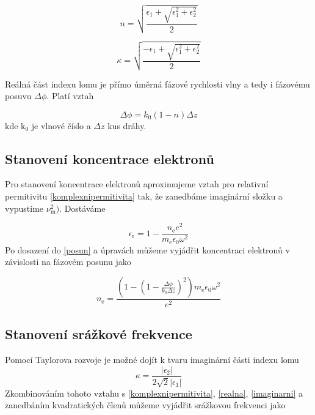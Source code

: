\documentclass[a4paper,12pt]{article}
\begin{document}
\begin{equation}
	n = \sqrt{\frac{\epsilon_1 + \sqrt{\epsilon_1^2 + \epsilon_2^2}}{2}}
	\label{realna}
\end{equation}

\begin{equation}
	\kappa = \sqrt{\frac{-\epsilon_1 + \sqrt{\epsilon_1^2 + \epsilon_2^2}}{2}}
	\label{imaginarni}
\end{equation}

Reálná část indexu lomu je
přímo úměrná fázové rychlosti vlny a tedy i fázovému posuvu $\Delta\phi$. Platí vztah

\begin{equation}
 	\Delta\phi = k_0(1-n) \Delta z
 	\label{posun}
\end{equation}
kde k$_0$ je vlnové číslo a $\Delta z$ kus dráhy.  

\subsection{Stanovení koncentrace elektronů}
Pro stanovení koncentrace elektronů aproximujeme vztah pro relativní permitivitu 
\eqref{komplexnipermitivita} tak, že zanedbáme imaginární složku a vypustíme 
$\nu_\text{m}^2)$. Dostáváme

\begin{equation}
	\epsilon_\text{r} = 1- \frac{n_\text{e} e^2}{m_\text{e} \epsilon_0 \omega^2}
	\label{permitivita}
\end{equation}
Po dosazení do \eqref{posun} a úpravách můžeme vyjádřit koncentraci elektronů
v závislosti na fázovém posunu jako

\begin{equation}
	n_\text{e} = \frac{\left(1-\left(1-\frac{\Delta\phi}{k_0 \Delta z} 
	\right)^2\right)
	m_\text{e} \epsilon_0 \omega^2}{e^2}
\end{equation}

\subsection{Stanovení srážkové frekvence}
Pomocí Taylorova rozvoje je možné dojít k tvaru imaginární části indexu lomu
\begin{equation}
	\kappa = \frac{|\epsilon_2|}{2\sqrt{2}|\epsilon_1|}
\end{equation}
Zkombinováním tohoto vztahu s \eqref{komplexnipermitivita}, \eqref{realna}, \eqref{imaginarni} a zanedbáním kvadratických členů můžeme vyjádřit srážkovou frekvenci jako
\end{document}
